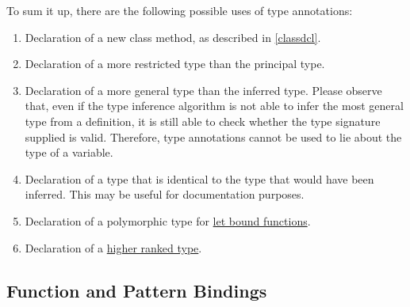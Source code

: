 To sum it up, there are the following possible uses of type annotations:
\begin{enumerate}
\item Declaration of a new class method, as described in \autoref{classdcl}.
\item Declaration of a more restricted type than the principal type.
\item Declaration of a more general type than the inferred type. Please observe that, even if the type inference algorithm is not able to infer the most general type from a definition, it is still able to check whether the type signature supplied is valid. Therefore, type annotations cannot be used to lie about the type of a variable.
\item Declaration of a type that is identical to the type that would have been inferred. This may be useful for documentation purposes.
\item Declaration of a polymorphic type for \hyperref[generalization]{let bound functions}.
\item Declaration of a \hyperref[higher-rank]{higher ranked type}.
\end{enumerate}


\subsection{Function and Pattern Bindings} \label{binding}

\begin{flushleft}
  \\
  \oder{} \\
  
  \alt {}  \\
 \sym{=}  
  \alt {}   
\end{flushleft}

